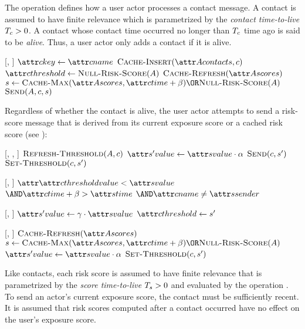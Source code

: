The \cHandleContactMessage operation defines how a user actor processes a contact message. A contact is assumed to have finite relevance which is parametrized by the \emph{contact time-to-live} $T_c > 0$. A contact whose contact time occurred no longer than $T_c$ time ago is said to be \emph{alive}. Thus, a user actor only adds a contact if it is alive.
%
\begin{function}{\nHandleContactMessage}[\vActor, \vContact]
    	\State $\aContactKey \assign \aContactName$
    	\State $\cCacheInsert[\aActorContacts, \vContact]$
    \EndIf
    \State $\aContactThreshold \assign \cNullRiskScore[\vActor]$
    \State $\cCacheRefresh[\aActorScores]$
    \State $\vScore \assign \cCacheMax[\aActorScores, \aContactTime + \pTimeBuffer] \OR \cNullRiskScore[\vActor]$
    \State $\cSend[\vActor, \vContact, \vScore]$
\end{function}
%
Regardless of whether the contact is alive, the user actor attempts to send a risk-score message that is derived from its current exposure score or a cached risk score (see ):
%
\begin{function}{\nSend}[\vActor, \vContact, \vScore]
    \State $\cRefreshThreshold[\vActor, \vContact]$
    \If{$\cShouldReceive[\vContact, \vScore]$}
        \State $\aNewScoreValue \assign \aScoreValue \cdot \pTransRate$
        \State $\cSend[\vContact, \vNewScore]$
        \State $\cSetThreshold[\vContact, \vNewScore]$
    \EndIf
\end{function}
%
\begin{function}{\nShouldReceive}[\vContact, \vScore]
    \State \Return $\aValue{\aContactThreshold} < \aScoreValue$
    \Statex $\AND \aContactTime + \pTimeBuffer > \aScoreTime$
    \Statex $\AND \aContactName \notEquals \aScoreSender$
\end{function}
\begin{function}{\nSetThreshold}[\vContact, \vScore]
    \State $\aNewScoreValue \assign \pSendCoeff \cdot \aScoreValue$
    \State $\aContactThreshold \assign \vNewScore$
\end{function}
%
\begin{function}{\nRefreshThreshold}[\vActor, \vContact]
        \State $\cCacheRefresh[\aActorScores]$
        \State $\vScore \assign \cCacheMax[\aActorScores, \aContactTime + \pTimeBuffer] \OR \cNullRiskScore[\vActor]$
        \State $\aNewScoreValue \assign \aScoreValue \cdot \pTransRate$
        \State $\cSetThreshold[\vContact, \vNewScore]$    
    \EndIf
\end{function}
%
Like contacts, each risk score is assumed to have finite relevance that is parametrized by the \emph{score time-to-live} $T_s > 0$ and evaluated by the operation . To send an actor's current exposure score, the contact must be sufficiently recent. It is assumed that risk scores computed after a contact occurred have no effect on the user's exposure score.

